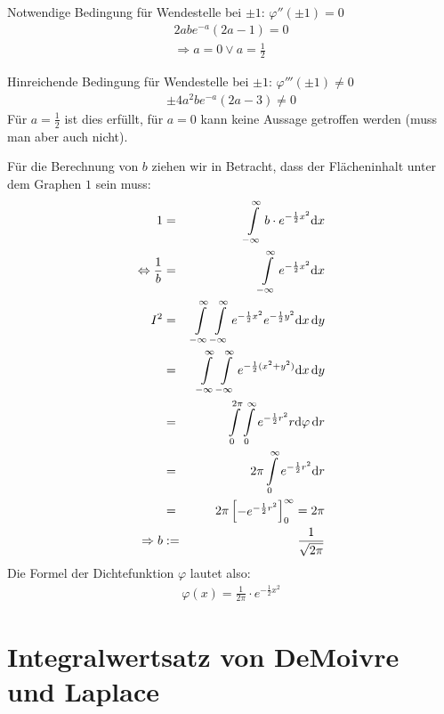 \documentclass[12pt,a4paper,twocolumn]{article}
\begin{document}
Notwendige Bedingung für Wendestelle bei $\pm 1$: $\varphi''(\pm 1)=0$\\
\begin{eqnarray}
2abe^{-a} (2a-1) = 0 \\
\Rightarrow a = 0 \lor a = \frac{1}{2}
\end{eqnarray}

Hinreichende Bedingung für Wendestelle bei $\pm 1$: $\varphi'''(\pm 1)\neq 0$
\begin{eqnarray}
\pm 4 a^{2} b e^{-a}(2 a -3) \neq 0
\end{eqnarray}
Für $a=\frac{1}{2}$ ist dies erfüllt, für $a=0$ kann keine Aussage getroffen werden (muss man aber auch nicht).

Für die Berechnung von $b$ ziehen wir in Betracht, dass der Flächeninhalt unter dem Graphen $1$ sein muss:
\begin{eqnarray}
1&=&\int\displaylimits^{\infty}_{-\infty} b \cdot e^{-\frac{1}{2}x^2} {\mathrm d}x \\
\Leftrightarrow \frac{1}{b}&=&\int\displaylimits^{\infty}_{-\infty} e^{-\frac{1}{2}x^2} {\mathrm d}x \\
I^2 &=& \int\displaylimits^{\infty}_{-\infty} \int\displaylimits^{\infty}_{-\infty} e^{-\frac{1}{2}x^2} e^{-\frac{1}{2}y^2} {\mathrm d}x \, {\mathrm d}y \\
&=& \int\displaylimits^{\infty}_{-\infty} \int\displaylimits^{\infty}_{-\infty} e^{-\frac{1}{2}(x^2 + y^2)} {\mathrm d}x \, {\mathrm d}y \\ 
&=& \int\displaylimits^{2 \pi}_{0} \int\displaylimits^{\infty}_{0} e^{-\frac{1}{2}r^2} r{\mathrm d}\varphi \, {\mathrm d}r \\
&=& 2 \pi \int\displaylimits^{\infty}_{0} e^{-\frac{1}{2}r^2} {\mathrm d}r \\
&=& 2 \pi \begin{bmatrix}-e^{-\frac{1}{2} r^2} \end{bmatrix}^\infty_0 = 2 \pi\\
\Rightarrow b&:=&\frac{1}{\sqrt{2\pi}}
\end{eqnarray}
Die Formel der Dichtefunktion $\varphi$ lautet also:
\begin{eqnarray}
 \varphi(x) = \frac{1}{2\pi} \cdot e^{-\frac{1}{2}x^2}
\end{eqnarray}




 \section{Integralwertsatz von DeMoivre und Laplace}
\end{document}

